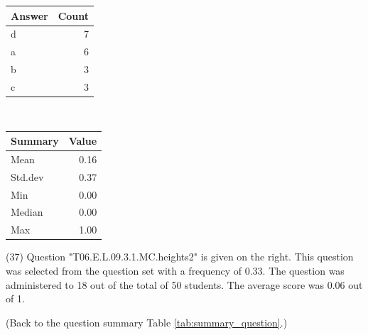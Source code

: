 \documentclass[12pt,english,nohyper]{tufte-handout}\usepackage[]{graphicx}\usepackage[]{color}
\begin{document}
\begin{center}%
\begin{tabular}{lr}
  \hline
Answer & Count \\ 
  \hline
d &   7 \\ 
  a &   6 \\ 
  b &   3 \\ 
  c &   3 \\ 
   \hline
\end{tabular}
~~~~~~~~%
\begin{tabular}{lr}
  \hline
Summary & Value \\ 
  \hline
Mean & 0.16 \\ 
  Std.dev & 0.37 \\ 
  Min & 0.00 \\ 
  Median & 0.00 \\ 
  Max & 1.00 \\ 
   \hline
\end{tabular}
\end{center}\newpage{} (37) Question "T06.E.L.09.3.1.MC.heights2" is given on the right. This question was selected from the question set with a frequency of 0.33. The question was administered to 18 out of the total of 50 students. The average score was 0.06 out of 1.

 (Back to the question summary Table \ref{tab:summary_question}.)
\end{document}
